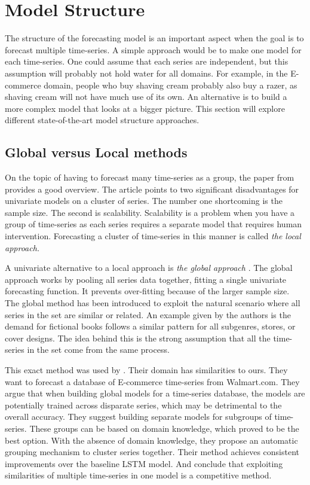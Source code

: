 \section{Model Structure}
\label{section:RelatedWork:Model-structure}
The structure of the forecasting model is an important aspect when the goal is to forecast
multiple time-series.
A simple approach would be to make one model for each time-series.
One could assume that each series are independent, but this assumption will probably not hold water for all domains.
For example, in the E-commerce domain,
people who buy shaving cream probably also buy a razer, as shaving cream will not have much use of its own.
An alternative is to build a more complex model that looks at a bigger picture.
This section will explore different state-of-the-art model structure approaches.

\subsection{Global versus Local methods}
On the topic of having to forecast many time-series as a group, the paper from \cite{Montero-Manso2021} provides a good overview.
The article points to two significant disadvantages for univariate models on a cluster of series.
The number one shortcoming is the sample size. The second is scalability.
Scalability is a problem when you have a group of time-series as each series requires a separate model
that requires human intervention. Forecasting a cluster of time-series in this manner is called
\textit{the local approach.}

A univariate alternative to a local approach is \textit{the global approach}
\citep{Rabanser2020}.
The global approach works by pooling all series data together, fitting a single univariate forecasting function. It prevents over-fitting because of the larger sample size.
The global method has been introduced to exploit the natural scenario where all series
in the set are similar or related. An example given by the authors is the demand for fictional
books follows a similar pattern for all subgenres, stores, or cover designs.
The idea behind this is the strong assumption that all the time-series in the set
come from the same process.

This exact method was used by \cite{Bandara2017}.
Their domain has similarities to ours. They want to forecast a database of E-commerce time-series
from Walmart.com.
They argue that when building global models for a time-series database, the models are
potentially trained across disparate series, which may be detrimental to the overall accuracy.
They suggest building separate models for subgroups of time-series.
These groups can be based on domain knowledge, which proved to be the best option. With the absence of
domain knowledge, they propose an automatic grouping mechanism to cluster series together.
Their method achieves consistent improvements over the baseline LSTM model.
And conclude that exploiting similarities of multiple time-series in one model is a competitive method.

